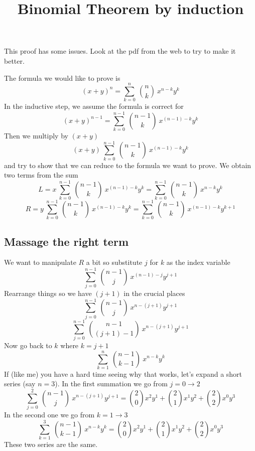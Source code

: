 \documentclass[11pt, oneside]{article}   	%
\title{Binomial Theorem by induction}
\date{}							%
\begin{document}
\maketitle

\large
\noindent

This proof has some issues.  Look at the pdf from the web to try to make it better.

The formula we would like to prove is
\[ (x+y)^n = \sum_{k=0}^{n} \ {n \choose k} \ x^{n-k}y^k \]
In the inductive step, we assume the formula is correct for 
\[ (x+y)^{n-1} = \sum_{k=0}^{n-1} \ {n-1 \choose k} \ x^{(n-1)-k}y^k \]
Then we multiply by $(x+y)$
\[ (x+y) \ \sum_{k=0}^{n-1} \ {n-1 \choose k} \ x^{(n-1)-k}y^k \]
and try to show that we can reduce to the formula we want to prove.  We obtain two terms from the sum
\[ L = x \ \sum_{k=0}^{n-1} \ {n-1 \choose k} \ x^{(n-1)-k}y^k = \sum_{k=0}^{n-1} \ {n-1 \choose k} \ x^{n-k}y^k \]
\[ R = y \ \sum_{k=0}^{n-1} \ {n-1 \choose k} \ x^{(n-1)-k}y^k = \sum_{k=0}^{n-1} \ {n-1 \choose k} \ x^{(n-1)-k}y^{k+1} \]
\subsection*{Massage the right term}
We want to manipulate $R$ a bit so substitute $j$ for $k$ as the index variable
\[ \sum_{j=0}^{n-1} \ {n-1 \choose j} \ x^{(n-1)-j}y^{j+1} \]
Rearrange things so we have $(j+1)$ in the crucial places
\[ \sum_{j=0}^{n-1} \ {n-1 \choose j} \ x^{n-(j+1)}y^{j+1} \]
\[ \sum_{j=0}^{n-1} \ {n-1 \choose (j+1)-1} \ x^{n-(j+1)}y^{j+1} \]
Now go back to $k$ where $k=j+1$
\[ \sum_{k=1}^{n} \ {n-1 \choose k-1} \ x^{n-k}y^{k} \]
If (like me) you have a hard time seeing why that works, let's expand a short series (say $n=3$).  In the first summation we go from $j=0 \to 2$
\[ \sum_{j=0}^{2} \ {n-1 \choose j} \ x^{n-(j+1)}y^{j+1} = {2 \choose 0}x^2y^1 + {2 \choose 1}x^1y^2 + {2 \choose 2}x^0y^3\]
In the second one we go from $k=1 \to 3$
\[ \sum_{k=1}^{3} \ {n-1 \choose k-1} \ x^{n-k}y^k = {2 \choose 0}x^2y^1 + {2 \choose 1}x^1y^2 + {2 \choose 2}x^0y^3\]
These two series are the same.
\end{document}
